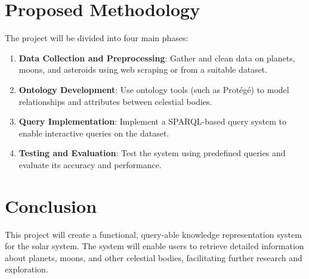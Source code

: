 \documentclass{article}
\begin{document}
\section{Proposed Methodology}
The project will be divided into four main phases:
\begin{enumerate}
    \item \textbf{Data Collection and Preprocessing}: Gather and clean data on planets, moons, and asteroids using web scraping or from a suitable dataset.
    \item \textbf{Ontology Development}: Use ontology tools (such as Protégé) to model relationships and attributes between celestial bodies.
    \item \textbf{Query Implementation}: Implement a SPARQL-based query system to enable interactive queries on the dataset.
    \item \textbf{Testing and Evaluation}: Test the system using predefined queries and evaluate its accuracy and performance.
\end{enumerate}

\section{Conclusion}
This project will create a functional, query-able knowledge representation system for the solar system. The system will enable users to retrieve detailed information about planets, moons, and other celestial bodies, facilitating further research and exploration.
\end{document}
